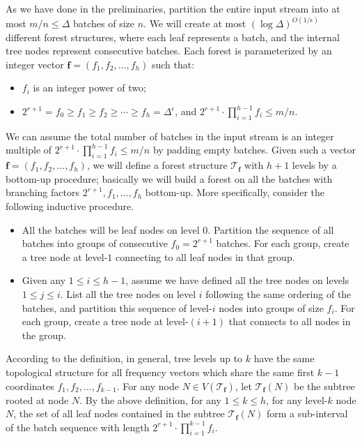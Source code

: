 \documentclass[11pt,a4paper]{article}
\newcommand{\tree}{\mathcal{T}}
\newcommand{\freq}{\mathbf{f}}
\begin{document}
As we have done in the preliminaries, partition the entire input stream into at most $m / n\leq \Delta$ batches of size $n$. We will create at most $(\log\Delta)^{O(1/\epsilon)}$ different forest structures, where each leaf represents a batch, and the internal tree nodes represent consecutive batches. Each forest is parameterized by an integer vector $\freq = (f_1, f_2, \ldots, f_{h})$ such that:
\begin{itemize}
	\item $f_i$ is an integer power of two;
	\item $2^{r+1}=f_0\geq f_1\geq f_2\geq \cdots \geq f_h = \Delta^\epsilon$, and $2^{r+1}\cdot \prod_{i=1}^{h-1} f_i\leq m/n$.
\end{itemize}

We can assume the total number of batches in the input stream is an integer multiple of $2^{r+1}\cdot \prod_{i=1}^{h-1} f_i\leq m/n$ by padding empty batches. Given such a vector $\freq = (f_1, f_2, \ldots, f_{h})$, we will define a forest structure $\tree_\freq$ with $h+1$ levels by a bottom-up procedure; basically we will build a forest on all the batches with branching factors $2^{r+1}, f_1, \ldots, f_h$ bottom-up. More specifically, consider the following inductive procedure.
\begin{itemize}
	\item All the batches will be leaf nodes on level $0$. Partition the sequence of all batches into groups of consecutive $f_0 = 2^{r+1}$ batches. For each group, create a tree node at level-$1$ connecting to all leaf nodes in that group.


	\item Given any $1\leq i\leq h-1$, assume we have defined all the tree nodes on levels $1\leq j\leq i$. List all the tree nodes on level $i$ following the same ordering of the batches, and partition this sequence of level-$i$ nodes into groups of size $f_i$. For each group, create a tree node at level-$(i+1)$ that connects to all nodes in the group.
\end{itemize}
According to the definition, in general, tree levels up to $k$ have the same topological structure for all frequency vectors which share the same first $k-1$ coordinates $f_1, f_2, \ldots, f_{k-1}$. For any node $N\in V(\tree_\freq)$, let $\tree_\freq(N)$ be the subtree rooted at node $N$. By the above definition, for any $1\leq k\leq h$, for any level-$k$ node $N$, the set of all leaf nodes contained in the subtree $\tree_\freq(N)$ form a sub-interval of the batch sequence with length $2^{r+1}\cdot \prod_{i=1}^{k-1}f_i$. 
\end{document}
